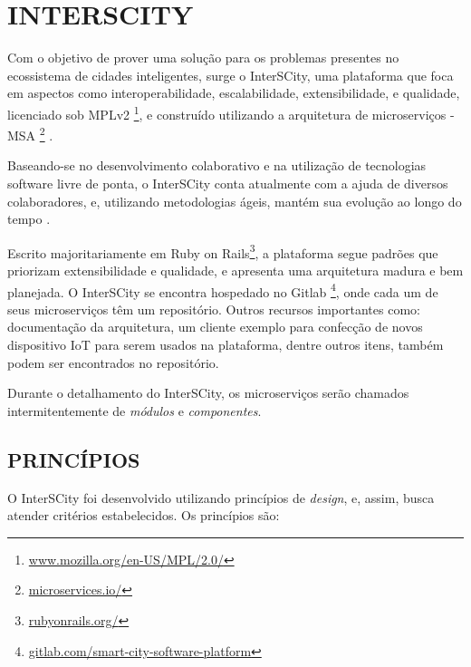 \chapter[INTERSCITY]{INTERSCITY}

Com o objetivo de prover uma solução para os problemas presentes no ecossistema
de cidades inteligentes, surge o InterSCity, uma plataforma que foca em
aspectos como interoperabilidade, escalabilidade, extensibilidade, e qualidade,
licenciado sob
MPLv2 \footnote{\url{www.mozilla.org/en-US/MPL/2.0/}}, e construído
utilizando a arquitetura de microserviços -
MSA \footnote{\url{microservices.io/}} \cite{delesposte2017}.

Baseando-se no desenvolvimento colaborativo e na utilização de tecnologias
software livre de ponta, o InterSCity conta atualmente com a ajuda de diversos
colaboradores, e, utilizando metodologias ágeis, mantém sua evolução ao longo
do tempo \cite{delesposte2017}.

Escrito majoritariamente em Ruby on Rails\footnote{\url{rubyonrails.org/}},
a plataforma segue padrões que priorizam extensibilidade e qualidade, e
apresenta uma arquitetura madura e bem planejada. O InterSCity se encontra
hospedado no Gitlab \footnote{\url{gitlab.com/smart-city-software-platform}},
onde cada um de seus microserviços têm um repositório. Outros recursos
importantes como: documentação da arquitetura, um cliente exemplo para
confecção de novos dispositivo IoT para serem usados na plataforma, dentre
outros itens, também podem ser encontrados no repositório.

Durante o detalhamento do InterSCity, os microserviços serão chamados
intermitentemente de \textit{módulos} e \textit{componentes}. %

\section{PRINCÍPIOS}

O InterSCity foi desenvolvido utilizando princípios de \textit{design}, e,
assim, busca atender critérios estabelecidos. Os princípios são:

